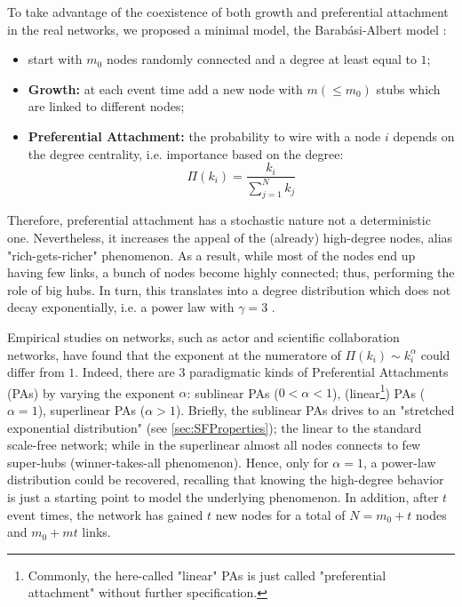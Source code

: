 \documentclass[a4paper,10pt]{book} %
\theoremstyle{definition}
\begin{document}
\label{sec:BA_model}
To take advantage of the coexistence of both growth and preferential attachment in the real networks, we proposed a minimal model, the Barabási-Albert model \cite{barabasi::2016networkbook}:
\begin{itemize}
	\item start with $m_0$ nodes randomly connected and a degree at least equal to $1$;
	\item \textbf{Growth:} at each event time add a new node with $m(\leq  m_0)$ stubs which are linked to different nodes;
	\item \textbf{Preferential Attachment:} the probability to wire with a node $i$ depends on the degree centrality, i.e. importance based on the degree:
	\begin{equation}
		\Pi(k_i) = \frac{k_i}{\sum_{j = 1}^N k_j}
	\end{equation}
\end{itemize}

Therefore, preferential attachment has a stochastic nature not a deterministic one. Nevertheless, it increases the appeal of the (already) high-degree nodes, alias \label{cit:S.Sagone} "rich-gets-richer" phenomenon. As a result, while most of the nodes end up having few links, a bunch of nodes become highly connected; thus, performing the role of big hubs. In turn, this translates into a degree distribution which does not decay exponentially, i.e. a power law with $\gamma = 3$ \cite{barabasi::2016networkbook}. 

Empirical studies on networks, such as actor and scientific collaboration networks, have found that the exponent at the numeratore of $\Pi(k_i) \sim k_i^\alpha$ could differ from $1$.
Indeed, there are $3$ paradigmatic kinds of Preferential Attachments (PAs) by varying the exponent $\alpha$: sublinear PAs ($0<\alpha<1$), (linear\footnote{Commonly, the here-called "linear" PAs is just called "preferential attachment" without further specification.}) PAs ($\alpha = 1$), superlinear PAs ($\alpha>1$). Briefly, the sublinear PAs drives to an "stretched exponential distribution" (see \autoref{sec:SFProperties}); the linear to the standard scale-free network; while in the superlinear almost all nodes connects to few super-hubs (winner-takes-all phenomenon).
Hence, only for $\alpha = 1$, a power-law distribution could be recovered, recalling that knowing the high-degree behavior is just a starting point to model the underlying phenomenon. 
In addition, after $t$ event times, the network has gained $t$ new nodes for a total of $N = m_0 + t$ nodes and $m_0 + mt$ links.
\end{document}
